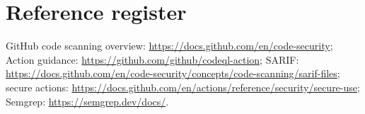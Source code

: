 \documentclass[10pt,letterpaper]{article}
\begin{document}
\section{Reference register}
GitHub code scanning overview: \url{https://docs.github.com/en/code-security}; Action guidance: \url{https://github.com/github/codeql-action}; SARIF: \url{https://docs.github.com/en/code-security/concepts/code-scanning/sarif-files}; secure actions: \url{https://docs.github.com/en/actions/reference/security/secure-use}; Semgrep: \url{https://semgrep.dev/docs/}.
\end{document}
